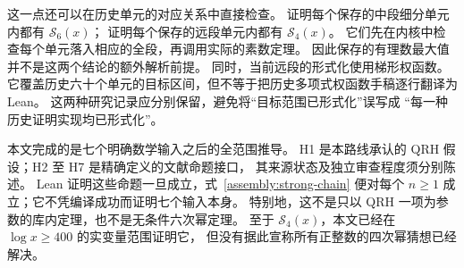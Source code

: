 这一点还可以在历史单元的对应关系中直接检查。
证明每个保存的中段细分单元内都有 $\mathcal S_6(x)$；
证明每个保存的远段单元内都有 $\mathcal S_4(x)$。
它们先在内核中检查每个单元落入相应的全段，再调用实际的素数定理。
因此保存的有理数最大值并不是这两个结论的额外解析前提。
同时，当前远段的形式化使用梯形权函数。
它覆盖历史六十个单元的目标区间，但不等于把历史多项式权函数手稿逐行翻译为 Lean。
这两种研究记录应分别保留，避免将“目标范围已形式化”误写成
“每一种历史证明实现均已形式化”。

\begin{remark}[主定理的逻辑范围]\label{assembly:scope}
本文完成的是七个明确数学输入之后的全范围推导。
H1 是本路线承认的 QRH 假设；H2 至 H7 是精确定义的文献命题接口，
其来源状态及独立审查程度须分别陈述。
Lean 证明这些命题一旦成立，式~\eqref{assembly:strong-chain}
便对每个 $n\geq1$ 成立；它不凭编译成功而证明七个输入本身。
特别地，这不是只以 QRH 一项为参数的库内定理，也不是无条件六次幂定理。
至于 $\mathcal S_4(x)$，本文已经在 $\log x\geq400$ 的实变量范围证明它，
但没有据此宣称所有正整数的四次幂猜想已经解决。
\end{remark}

